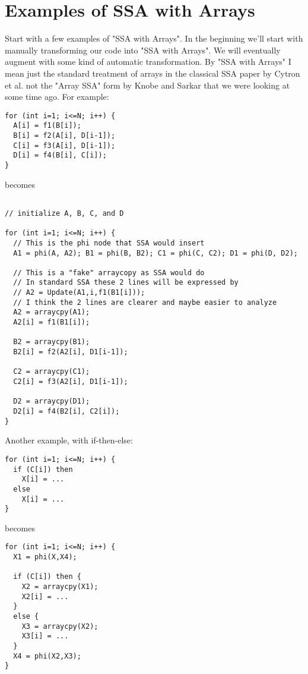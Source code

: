 \documentclass{article}
\begin{document}
\section{Examples of SSA with Arrays}

Start with a few examples of "SSA with Arrays". In the beginning we'll start with manually transforming our code into "SSA with Arrays". We will eventually augment with some kind of automatic transformation. By "SSA with Arrays" I mean just the standard treatment of arrays in the classical SSA paper by Cytron et al. not the "Array SSA" form by Knobe and Sarkar that we were looking at some time ago. For example:

\begin{verbatim}
for (int i=1; i<=N; i++) {
  A[i] = f1(B[i]);
  B[i] = f2(A[i], D[i-1]);
  C[i] = f3(A[i], D[i-1]);
  D[i] = f4(B[i], C[i]);
}
\end{verbatim}

becomes

\begin{verbatim}

// initialize A, B, C, and D

for (int i=1; i<=N; i++) {
  // This is the phi node that SSA would insert
  A1 = phi(A, A2); B1 = phi(B, B2); C1 = phi(C, C2); D1 = phi(D, D2); 

  // This is a "fake" arraycopy as SSA would do
  // In standard SSA these 2 lines will be expressed by
  // A2 = Update(A1,i,f1(B1[i]));
  // I think the 2 lines are clearer and maybe easier to analyze
  A2 = arraycpy(A1); 
  A2[i] = f1(B1[i]); 
  
  B2 = arraycpy(B1);
  B2[i] = f2(A2[i], D1[i-1]);
  
  C2 = arraycpy(C1);
  C2[i] = f3(A2[i], D1[i-1]);
  
  D2 = arraycpy(D1);
  D2[i] = f4(B2[i], C2[i]);
}
\end{verbatim}

Another example, with if-then-else:

\begin{verbatim}
for (int i=1; i<=N; i++) {
  if (C[i]) then
    X[i] = ...
  else 
    X[i] = ...   
}
\end{verbatim}

becomes

\begin{verbatim}
for (int i=1; i<=N; i++) {
  X1 = phi(X,X4); 
  
  if (C[i]) then {
    X2 = arraycpy(X1);
    X2[i] = ...
  }  
  else {
    X3 = arraycpy(X2);
    X3[i] = ...
  }     
  X4 = phi(X2,X3);
}
\end{verbatim}
 
\end{document}
